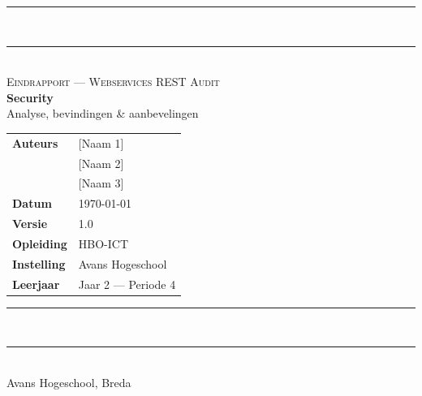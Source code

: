 \documentclass[11pt, a4paper]{report}
\begin{document}
\begin{titlepage}
    \centering
    \vspace*{0.8cm}

    {\color{avansred}\rule{\linewidth}{3pt}}\\[0.4cm]
    {\color{avansred}\rule{\linewidth}{0.8pt}}\\[1.4cm]

    {\large\color{textgray}\textsc{Eindrapport --- Webservices REST Audit}}\\[0.8cm]

    {\fontsize{34}{40}\selectfont\bfseries\color{avansred} Security}\\[0.4cm]
    {\Large\color{avansdark} Analyse, bevindingen \& aanbevelingen}\\[1.8cm]

    \begin{tabular}{@{}ll@{}}
        \color{textgray}\textbf{Auteurs}      & [Naam 1]                  \\[2pt]
                                               & [Naam 2]                  \\[2pt]
                                               & [Naam 3]                  \\[10pt]
        \color{textgray}\textbf{Datum}         & \today                    \\[2pt]
        \color{textgray}\textbf{Versie}        & 1.0                       \\[2pt]
        \color{textgray}\textbf{Opleiding}     & HBO-ICT                   \\[2pt]
        \color{textgray}\textbf{Instelling}    & Avans Hogeschool          \\[2pt]
        \color{textgray}\textbf{Leerjaar}      & Jaar 2 --- Periode 4      \\
    \end{tabular}

    \vfill

    {\color{avansred}\rule{\linewidth}{0.8pt}}\\[0.3cm]
    {\color{avansred}\rule{\linewidth}{3pt}}\\[0.6cm]

    {\small\color{textgray}Avans Hogeschool, Breda}
\end{titlepage}

\tableofcontents
\clearpage
\end{document}
